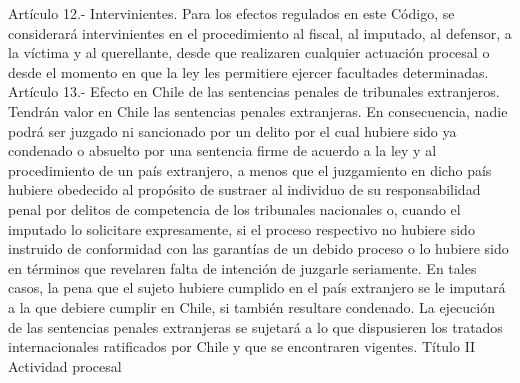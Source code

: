     Artículo 12.- Intervinientes. Para los efectos regulados en este Código, se considerará intervinientes en el procedimiento al fiscal, al imputado, al defensor, a la víctima y al querellante, desde que realizaren cualquier actuación procesal o desde el momento en que la ley les permitiere ejercer facultades determinadas.
    Artículo 13.- Efecto en Chile de las sentencias penales de tribunales extranjeros. Tendrán valor en Chile las sentencias penales extranjeras. En consecuencia, nadie podrá ser juzgado ni sancionado por un delito por el cual hubiere sido ya condenado o absuelto por una sentencia firme de acuerdo a la ley y al procedimiento de un país extranjero, a menos que el juzgamiento en dicho país hubiere obedecido al propósito de sustraer al individuo de su responsabilidad penal por delitos de competencia de los tribunales nacionales o, cuando el imputado lo solicitare expresamente, si el proceso respectivo no hubiere sido instruido de conformidad con las garantías de un debido proceso o lo hubiere sido en términos que revelaren falta de intención de juzgarle seriamente.
    En tales casos, la pena que el sujeto hubiere cumplido en el país extranjero se le imputará a la que debiere cumplir en Chile, si también resultare condenado.
    La ejecución de las sentencias penales extranjeras se sujetará a lo que dispusieren los tratados internacionales ratificados por Chile y que se encontraren vigentes.
    Título II
    Actividad procesal

